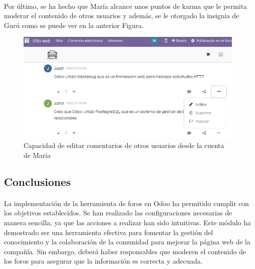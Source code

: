 \paragraph{}
Por último, se ha hecho que María alcance unos puntos de karma que le permita moderar el contenido de otros usuarios y además, se le otorgado la insignia de Gurú como se puede ver en la anterior Figura.
\newpage
\begin{figure}[h]
    \centering
    \includegraphics[width=1\linewidth]{fotosGestCon/privilegio.png}
    \caption{Capacidad de editar comentarios de otros usuarios desde la cuenta de María}
    \label{fig:enter-label}
\end{figure}
\subsection{Conclusiones}
\paragraph{}
La implementación de la herramienta de foros en Odoo ha permitido cumplir con los objetivos establecidos. Se han realizado las configuraciones necesarias de manera sencilla, ya que las acciones a realizar han sido intuitivas. 
Este módulo ha demostrado ser una herramienta efectiva para fomentar la gestión del conocimiento y la colaboración de la comunidad para mejorar la página web de la compañía. Sin embargo, deberá haber responsables que moderen el contenido de los foros para asegurar que la información es correcta y adecuada.